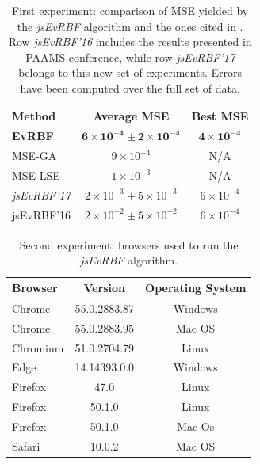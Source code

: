 \documentclass{article}
\begin{document}
\setlength{\tabcolsep}{10pt}
\begin{table}
\caption{First experiment: comparison of MSE yielded by the {\em
    jsEvRBF} algorithm and the ones cited in \cite{rivas03:EvRBF}. Row
  {\em jsEvRBF'16} includes the results presented in PAAMS conference,
  while row {\em jsEvRBF'17} belongs to this new set of
  experiments. Errors have been computed over the full set of data.}
\label{tab:comparison-first-experiment}
\begin{center}
\begin{tabular}{lcc}
{\bf Method} & {\bf Average MSE} & {\bf Best MSE} \\
\hline
\bf EvRBF & $\mathbf{6 \times 10^{-4} \pm 2 \times 10^{-4}}$ &$\mathbf{4 \times 10^{-4}}$ \\
MSE-GA & $9 \times 10^{-4}$ & N/A \\
MSE-LSE &  $1 \times 10^{-3}$ & N/A \\
{\em jsEvRBF'17} & $\mathit{2 \times 10^{-3} \pm 5 \times 10^{-3}}$ & $\mathit{6 \times 10^{-4}}$  \\
jsEvRBF'16 & $2 \times 10^{-2} \pm 5 \times 10^{-2}$ & $6 \times10^{-4}$  \\
\hline
\end{tabular}
\end{center}
\end{table}

\newpage
\clearpage


\setlength{\tabcolsep}{10pt}
\begin{table}
\caption{Second experiment: browsers used to run the {\em jsEvRBF}
  algorithm.}
\label{tab:browsers-second-experiment}
\begin{center}
\begin{tabular}{lcc}
{\bf Browser} & {\bf Version} & {\bf Operating System} \\
\hline
Chrome & 55.0.2883.87 & Windows \\
Chrome & 55.0.2883.95 & Mac OS \\
Chromium\protect\footnotemark & 51.0.2704.79 & Linux \\
Edge & 14.14393.0.0 & Windows \\
Firefox & 47.0 & Linux \\
Firefox & 50.1.0 & Linux \\
Firefox & 50.1.0 & Mac Os \\
Safari & 10.0.2 & Mac OS \\
\hline
\end{tabular}
\end{center}
\end{table}
\end{document}
